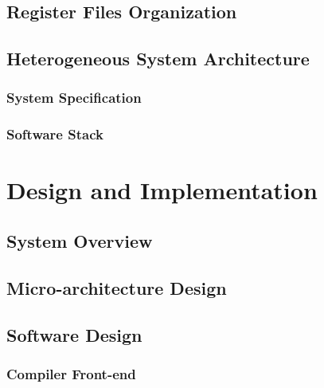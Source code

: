 \documentclass[12pt]{article}
\begin{document}
\begin{CJK}{UTF8}{bkai}
    \subsection{Register Files Organization}
    \subsection{Heterogeneous System Architecture}
        \subsubsection{System Specification}
        \subsubsection{Software Stack}

\section{Design and Implementation}
    \subsection{System Overview}
    \subsection{Micro-architecture Design}
    \subsection{Software Design}
        \subsubsection{Compiler Front-end}

\end{CJK}
\end{document}
